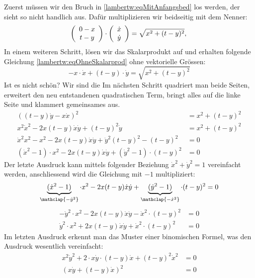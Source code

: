 Zuerst müssen wir den Bruch in \eqref{lambertw:eqMitAnfangsbed} los werden, der sieht so nicht handlich aus. Dafür multiplizieren wir beidseitig mit dem Nenner:
\[
	\left( \begin{array}{c} 0-x \\ t-y \end{array} \right)
	\cdot
	\left(\begin{array}{c} \dot{x} \\ \dot{y} \end{array}\right)
	= \sqrt{x^2 + (t-y)^2},\\
\]
In einem weiteren Schritt, lösen wir das Skalarprodukt auf und erhalten folgende Gleichung \eqref{lambertw:eqOhneSkalarprod} ohne vektorielle Grössen:
\begin{equation}
		-x \cdot \dot{x} + (t-y) \cdot \dot{y}
		= \sqrt{x^2 + (t-y)^2}
		\label{lambertw:eqOhneSkalarprod}
\end{equation}
Ist es nicht schön? Wir sind die 
Im nächsten Schritt quadriert man beide Seiten, erweitert den neu entstandenen quadratischen Term, bringt alles auf die linke Seite und klammert gemeinsames aus.
\begin{align*}
	((t-y) \dot{y} - x \dot{x})^2
	&= x^2 + (t-y)^2 \\
	x^2 \dot{x}^2 - 2x(t-y) \dot{x} \dot{y} + (t-y)^2 \dot{y}
	&= x^2 + (t-y)^2 \\
	\dot{x}^2 x^2 - x^2 - 2x(t-y) \dot{x} \dot{y} + \dot{y}^2 (t-y)^2 - (t-y)^2
	&= 0 \\
	(\dot{x}^2 - 1) \cdot x^2 - 2x(t-y) \dot{x} \dot{y} + (\dot{y}^2 - 1) \cdot (t-y)^2
	&= 0
\end{align*}
Der letzte Ausdruck kann mittels folgender Beziehung \(\dot{x}^2 + \dot{y}^2 = 1\) vereinfacht werden, anschliessend wird die Gleichung mit \(-1\) multipliziert:
\[
	\underbrace{(\dot{x}^2 - 1)}_{\mathclap{-\dot{y}^2}} \cdot x^2 - 2x(t-y) \dot{x} \dot{y} + \underbrace{(\dot{y}^2 - 1)}_{\mathclap{-\dot{x}^2}} \cdot (t-y)^2
	= 0
\]
\begin{align*}
	- \dot{y}^2 \cdot x^2 - 2x(t-y) \dot{x} \dot{y} - \dot{x}^2 \cdot (t-y)^2
	&= 0 \\
	\dot{y}^2 \cdot x^2 + 2x(t-y) \dot{x} \dot{y} + \dot{x}^2 \cdot (t-y)^2
	&= 0
\end{align*}
Im letzten Ausdruck erkennt man das Muster einer binomischen Formel, was den Ausdruck wesentlich vereinfacht:
\begin{align*}
	x^2 \dot{y}^2  + 2 \cdot x \dot{y} \cdot (t-y) \dot{x}  + (t-y)^2 \dot{x}^2
	&= 0 \\
	(x \dot{y} + (t-y) \dot{x})^2
	&= 0
\end{align*}

